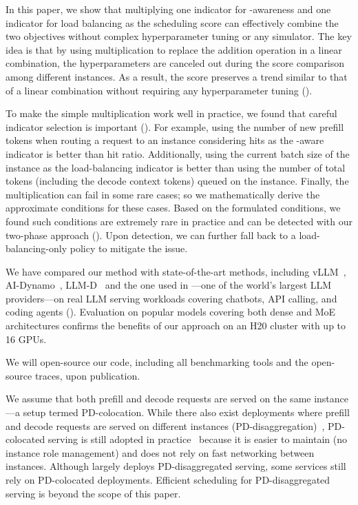 In this paper, we show that multiplying one indicator for {\kvcache}-awareness and 
one indicator for load balancing 
as the scheduling score can effectively combine the two objectives
without complex hyperparameter tuning or any simulator.
The key idea is that by using multiplication to replace
the addition operation in a linear combination,
the hyperparameters are canceled out during the score comparison among different instances.
As a result, the score preserves a trend similar to that of a linear combination
without requiring any hyperparameter tuning (\textsection{\ref{sec:method}}).

To make the simple multiplication work well in practice, 
we found that careful indicator selection is important (\textsection{\ref{sec:indicators}}).
For example,
using the number of new prefill tokens when routing a request to an instance
considering {\kvcache} hits as the {\kvcache}-aware indicator is
better than {\kvcache} hit ratio.
Additionally, using the current batch size of the instance as the load-balancing indicator
is better than using the number of total tokens (including the decode context tokens) queued on the instance.
Finally, the multiplication can fail in some rare cases; 
so we mathematically derive the approximate conditions for these cases. 
Based on the formulated conditions, we found such conditions are extremely rare in practice 
and can be detected with our two-phase approach (\textsection{\ref{sec:m-analyze}}).
Upon detection, we can further fall back to a load-balancing-only policy to mitigate the issue. 

We have compared our method with state-of-the-art methods, including vLLM~\cite{vllm-code}, AI-Dynamo~\cite{ai-Dynamo}, LLM-D~\cite{llm-d} and
the one used in {\company}---one of the world's largest LLM providers---on real LLM serving workloads
covering chatbots, API calling, and coding agents (\textsection{\ref{sec:eval-setup}}).
Evaluation on popular models covering both dense and MoE architectures confirms the benefits
of our approach on an H20 cluster with up to 16 GPUs.

We will open-source our code, including all benchmarking tools and the open-source traces, upon publication.

We assume that both prefill and decode requests are served on the same instance---a setup termed
PD-colocation.
While there also exist deployments where prefill and decode requests are served on different instances (PD-disaggregation)~\cite{DBLP:conf/isca/PatelCZSGMB24,DBLP:conf/osdi/ZhongLCHZL0024},
PD-colocated serving is still adopted in practice~\cite{DBLP:conf/sosp/Xiang0QYZYZL0025}
because it is easier to maintain (no instance role management)
and does not rely on fast networking between instances.
Although {\company} largely deploys PD-disaggregated serving,
some services still rely on PD-colocated deployments.
Efficient scheduling for PD-disaggregated serving is beyond the scope of this paper. 





